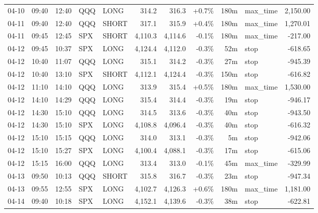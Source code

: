 \documentclass[11pt,a4paper,twoside]{article}
\begin{document}
\begin{center}
\begin{longtable}{>{\color{txtmain}}l l l l l r r r r >{\color{txtmain}}l r}
04-10 & 09:40 & 12:40 & QQQ & LONG & 314.2 & 316.3 & \textcolor{wingreen}{+0.7\%} & 180m & max\_time & \textcolor{wingreen}{2,150.00} \\
04-11 & 09:40 & 12:40 & QQQ & SHORT & 317.1 & 315.9 & \textcolor{wingreen}{+0.4\%} & 180m & max\_time & \textcolor{wingreen}{1,270.01} \\
04-11 & 09:45 & 12:45 & SPX & SHORT & 4,110.3 & 4,114.6 & \textcolor{lossred}{-0.1\%} & 180m & max\_time & \textcolor{lossred}{-217.00} \\
04-12 & 09:45 & 10:37 & SPX & LONG & 4,124.4 & 4,112.0 & \textcolor{lossred}{-0.3\%} & 52m & stop & \textcolor{lossred}{-618.65} \\
04-12 & 10:40 & 11:07 & QQQ & LONG & 315.1 & 314.2 & \textcolor{lossred}{-0.3\%} & 27m & stop & \textcolor{lossred}{-945.39} \\
04-12 & 10:40 & 13:10 & SPX & SHORT & 4,112.1 & 4,124.4 & \textcolor{lossred}{-0.3\%} & 150m & stop & \textcolor{lossred}{-616.82} \\
04-12 & 11:10 & 14:10 & QQQ & LONG & 313.9 & 315.4 & \textcolor{wingreen}{+0.5\%} & 180m & max\_time & \textcolor{wingreen}{1,530.00} \\
04-12 & 14:10 & 14:29 & QQQ & LONG & 315.4 & 314.4 & \textcolor{lossred}{-0.3\%} & 19m & stop & \textcolor{lossred}{-946.17} \\
04-12 & 14:30 & 15:10 & QQQ & LONG & 314.5 & 313.6 & \textcolor{lossred}{-0.3\%} & 40m & stop & \textcolor{lossred}{-943.50} \\
04-12 & 14:30 & 15:10 & SPX & LONG & 4,108.8 & 4,096.4 & \textcolor{lossred}{-0.3\%} & 40m & stop & \textcolor{lossred}{-616.32} \\
04-12 & 15:10 & 15:15 & QQQ & LONG & 314.0 & 313.1 & \textcolor{lossred}{-0.3\%} & 5m & stop & \textcolor{lossred}{-942.06} \\
04-12 & 15:10 & 15:27 & SPX & LONG & 4,100.4 & 4,088.1 & \textcolor{lossred}{-0.3\%} & 17m & stop & \textcolor{lossred}{-615.06} \\
04-12 & 15:15 & 16:00 & QQQ & LONG & 313.4 & 313.0 & \textcolor{lossred}{-0.1\%} & 45m & max\_time & \textcolor{lossred}{-329.99} \\
04-13 & 09:50 & 10:13 & QQQ & SHORT & 315.8 & 316.7 & \textcolor{lossred}{-0.3\%} & 23m & stop & \textcolor{lossred}{-947.34} \\
04-13 & 09:55 & 12:55 & SPX & LONG & 4,102.7 & 4,126.3 & \textcolor{wingreen}{+0.6\%} & 180m & max\_time & \textcolor{wingreen}{1,181.00} \\
04-14 & 09:40 & 10:18 & SPX & LONG & 4,152.1 & 4,139.6 & \textcolor{lossred}{-0.3\%} & 38m & stop & \textcolor{lossred}{-622.81} \\

\end{longtable}
\end{center}
\end{document}
